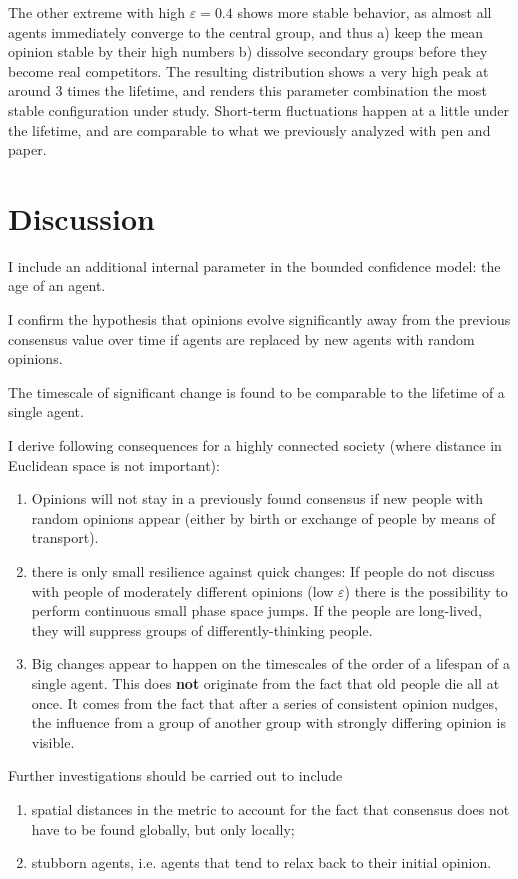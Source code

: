 \documentclass[useAMS,usenatbib]{mn2e}
\begin{document}
The other extreme with high $\varepsilon=0.4$ shows more stable
behavior, as almost all agents immediately converge to the central
group, and thus a) keep the mean opinion stable by their high numbers
b) dissolve secondary groups before they become real competitors. The
resulting distribution shows a very high peak at around 3 times the
lifetime, and renders this parameter combination the most stable
configuration under study. Short-term fluctuations happen at a little
under the lifetime, and are comparable to what we previously analyzed
with pen and paper.

\section{Discussion}
\label{sec:discussion}


I include an additional internal parameter in the bounded confidence
model: the age of an agent.

I confirm the hypothesis that opinions evolve significantly away
from the previous consensus value over time if agents
are replaced by new agents with random opinions.

The timescale of significant change is found to be comparable to the lifetime of a single agent.

I derive following consequences for a highly connected society (where distance in
Euclidean space is not important):

\begin{enumerate}
    \item Opinions will not stay in a previously found consensus if
    new people with random opinions appear (either by birth or
    exchange of people by means of transport).
    \item there is only small resilience against quick changes: If people
    do not discuss with people of moderately different opinions (low $\varepsilon$) there is the possibility to
    perform continuous small phase space jumps. If the people are
    long-lived, they will suppress groups of differently-thinking
    people.
    \item Big changes appear to happen on the timescales of the
    order of a lifespan of a single agent. This does {\bf not}
    originate from the fact that old people die all at once. It
    comes from the fact that after a series of consistent opinion
    nudges, the influence from a group of another group with strongly
    differing opinion is visible.
\end{enumerate}


Further investigations should be carried out to include

\begin{enumerate}
    \item spatial distances in the metric to account for the fact that
    consensus does not have to be found globally, but only locally;
    \item stubborn agents, i.e. agents that tend to relax back to their
    initial opinion.
\end{enumerate}
\end{document}
